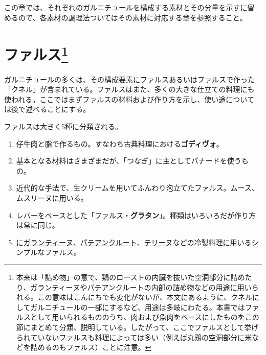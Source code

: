 この章では、それぞれのガルニチュールを構成する素材とその分量を示すに留
めるので、各素材の調理法ついてはその素材に対応する章を参照すること。

\hypertarget{serie-des-farces-diverses}{%
\section[ファルス]{\texorpdfstring{ファルス\footnote{本来は「詰め物」の意で、鶏のローストの内臓を抜いた空洞部分に詰めたり、ガランティーヌやパテアンクルートの内部の詰め物などの用途に用いられる。この意味はこんにちでも変化がないが、本文にあるように、クネルにしてガルニチュールの一部にするなど、用途は多岐にわたる。本書ではファルスとして用いられるもののうち、肉および魚肉をベースにしたものをこの節にまとめて分類、説明している。したがって、ここでファルスとして挙げられていないファルスも料理によっては多い（例えば丸鶏の空洞部分に米などを詰めるのもファルス）ことに注意。}}{ファルス}}\label{serie-des-farces-diverses}}


 

ガルニチュールの多くは、その構成要素にファルスあるいはファルスで作った
「クネル」が含まれている。ファルスはまた、多くの大きな仕立ての料理にも
使われる。ここではまずファルスの材料および作り方を示し、使い途について
は後で述べることにする。

ファルスは大きく5種に分類される。

\begin{enumerate}
\def\labelenumi{\arabic{enumi}.}
\item
  仔牛肉と脂で作るもの。すなわち古典料理における\textbf{ゴディヴォ}。
\item
  基本となる材料はさまざまだが、「つなぎ」に主としてパナードを使うもの。
\item
  近代的な手法で、生クリームを用いてふんわり泡立てたファルス。ムース、ムスリーヌに用いる。
\item
  レバーをベースとした「ファルス・\textbf{グラタン}」。種類はいろいろだが作り方は常に同じ。
\item
  に\protect\hyperlink{}{ガランティーヌ}、\protect\hyperlink{}{パテアンクルート}、\protect\hyperlink{}{テリーヌ}などの冷製料理に用いるシンプルなファルス。
\end{enumerate}

\newpage

